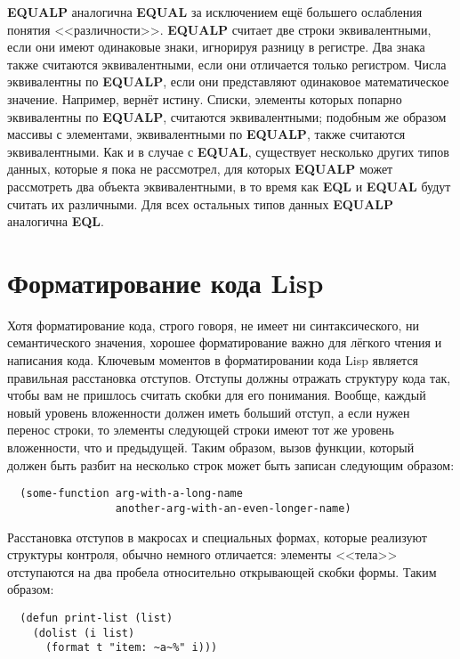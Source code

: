 \textbf{EQUALP} аналогична \textbf{EQUAL} за исключением ещё большего ослабления понятия
<<различности>>. \textbf{EQUALP} считает две строки эквивалентными, если они имеют
одинаковые знаки, игнорируя разницу в регистре. Два знака также считаются эквивалентными,
если они отличается только регистром. Числа эквивалентны по \textbf{EQUALP}, если они
представляют одинаковое математическое значение. Например,  вернёт
истину. Списки, элементы которых попарно эквивалентны по \textbf{EQUALP}, считаются
эквивалентными; подобным же образом массивы с элементами, эквивалентными по
\textbf{EQUALP}, также считаются эквивалентными. Как и в случае с \textbf{EQUAL},
существует несколько других типов данных, которые я пока не рассмотрел, для которых
\textbf{EQUALP} может рассмотреть два объекта эквивалентными, в то время как \textbf{EQL}
и \textbf{EQUAL} будут считать их различными. Для всех остальных типов данных
\textbf{EQUALP} аналогична \textbf{EQL}.

\section{Форматирование кода Lisp}

Хотя форматирование кода, строго говоря, не имеет ни синтаксического, ни семантического
значения, хорошее форматирование важно для лёгкого чтения и написания кода. Ключевым
моментов в форматировании кода Lisp является правильная расстановка отступов. Отступы
должны отражать структуру кода так, чтобы вам не пришлось считать скобки для его
понимания. Вообще, каждый новый уровень вложенности должен иметь больший отступ, а если
нужен перенос строки, то элементы следующей строки имеют тот же уровень вложенности, что и
предыдущей. Таким образом, вызов функции, который должен быть разбит на несколько строк
может быть записан следующим образом:

\begin{lstlisting}
  (some-function arg-with-a-long-name
                 another-arg-with-an-even-longer-name)
\end{lstlisting}

Расстановка отступов в макросах и специальных формах, которые реализуют структуры
контроля, обычно немного отличается: элементы <<тела>> отступаются на два пробела
относительно открывающей скобки формы. Таким образом:

\begin{lstlisting}
  (defun print-list (list)
    (dolist (i list)
      (format t "item: ~a~%" i)))
\end{lstlisting}

